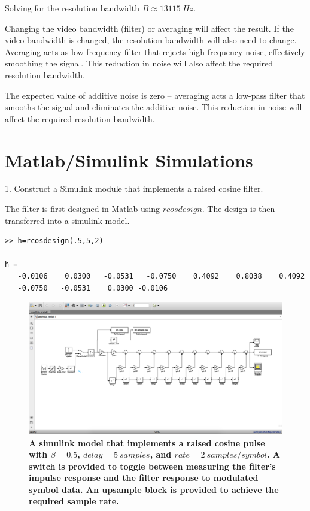 \documentclass[letterpaper,12pt]{article}
\begin{document}
Solving for the resolution bandwidth $B\approx13115\ Hz$.

Changing the video bandwidth (filter) or averaging will affect the result. If
the video bandwidth is changed, the resolution bandwidth will also need to
change. Averaging acts as low-frequency filter that rejects high frequency
noise, effectively smoothing the signal. This reduction in noise will also
affect the required resolution bandwidth.

The expected value of additive noise is zero – averaging acts a low-pass filter
that smooths the signal and eliminates the additive noise. This reduction in
noise will affect the required resolution
bandwidth.
\pagebreak

\section*{Matlab/Simulink Simulations}

1. Construct a Simulink module that implements a raised cosine filter.

The filter is first designed in Matlab using $rcosdesign$. The design is then
transferred into a simulink model.

\begin{verbatim}
>> h=rcosdesign(.5,5,2)

h =
   -0.0106    0.0300   -0.0531   -0.0750    0.4092    0.8038    0.4092
   -0.0750   -0.0531    0.0300 -0.0106
\end{verbatim}


\begin{figure}[hbtp]
\includegraphics[width=1.0\columnwidth]{prelab1-simulation-diagram}
\caption{
\label{fig:prelab1-simulation-diagram}
{\bf A simulink model that implements a raised cosine pulse with $\beta=0.5$,
$delay = 5\ samples$, and $rate = 2\ samples/symbol$. A switch is provided to
toggle between measuring the filter's impulse response and the filter response
to modulated symbol data. An upsample block is provided to achieve the required
sample rate.
}
}
\end{figure}
\end{document}

